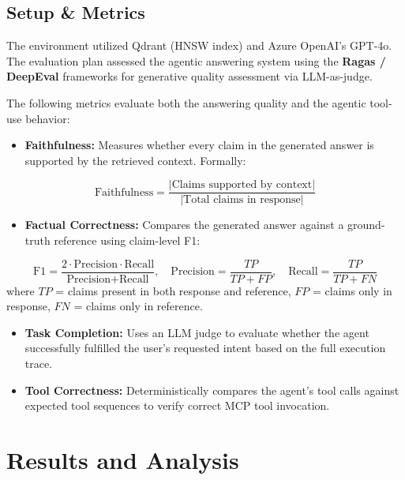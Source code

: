 \documentclass[12pt]{article}
\begin{document}
\subsection{Setup \& Metrics}
The environment utilized Qdrant (HNSW index) and Azure OpenAI's GPT-4o. The evaluation plan assessed the agentic answering system using the \textbf{Ragas / DeepEval} frameworks for generative quality assessment via LLM-as-judge.

The following metrics evaluate both the answering quality and the agentic tool-use behavior:

\begin{itemize}
    \item \textbf{Faithfulness:} Measures whether every claim in the generated answer is supported by the retrieved context. Formally:
\end{itemize}
\begin{equation}
\text{Faithfulness} = \frac{|\text{Claims supported by context}|}{|\text{Total claims in response}|}
\end{equation}

\begin{itemize}
    \item \textbf{Factual Correctness:} Compares the generated answer against a ground-truth reference using claim-level F1:
\end{itemize}
\begin{equation}
\text{F1} = \frac{2 \cdot \text{Precision} \cdot \text{Recall}}{\text{Precision} + \text{Recall}}, \quad \text{Precision} = \frac{TP}{TP + FP}, \quad \text{Recall} = \frac{TP}{TP + FN}
\end{equation}
where $TP$ = claims present in both response and reference, $FP$ = claims only in response, $FN$ = claims only in reference.

\begin{itemize}
    \item \textbf{Task Completion:} Uses an LLM judge to evaluate whether the agent successfully fulfilled the user's requested intent based on the full execution trace.
    \item \textbf{Tool Correctness:} Deterministically compares the agent's tool calls against expected tool sequences to verify correct MCP tool invocation.
\end{itemize}

\newpage
\section{Results and Analysis}
\end{document}
